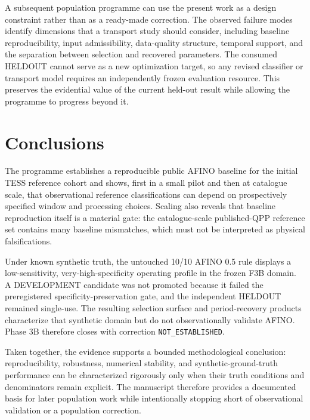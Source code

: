 \documentclass[11pt,a4paper]{article}
\begin{document}
A subsequent population programme can use the present work as a design constraint rather than as a ready-made correction. The observed failure modes identify dimensions that a transport study should consider, including baseline reproducibility, input admissibility, data-quality structure, temporal support, and the separation between selection and recovered parameters. The consumed HELDOUT cannot serve as a new optimization target, so any revised classifier or transport model requires an independently frozen evaluation resource. This preserves the evidential value of the current held-out result while allowing the programme to progress beyond it.

\section{Conclusions}
The programme establishes a reproducible public AFINO baseline for the initial TESS reference cohort and shows, first in a small pilot and then at catalogue scale, that observational reference classifications can depend on prospectively specified window and processing choices. Scaling also reveals that baseline reproduction itself is a material gate: the catalogue-scale published-QPP reference set contains many baseline mismatches, which must not be interpreted as physical falsifications.

Under known synthetic truth, the untouched 10/10 AFINO 0.5 rule displays a low-sensitivity, very-high-specificity operating profile in the frozen F3B domain. A DEVELOPMENT candidate was not promoted because it failed the preregistered specificity-preservation gate, and the independent HELDOUT remained single-use. The resulting selection surface and period-recovery products characterize that synthetic domain but do not observationally validate AFINO. Phase 3B therefore closes with correction \texttt{NOT\_ESTABLISHED}.

Taken together, the evidence supports a bounded methodological conclusion: reproducibility, robustness, numerical stability, and synthetic-ground-truth performance can be characterized rigorously only when their truth conditions and denominators remain explicit. The manuscript therefore provides a documented basis for later population work while intentionally stopping short of observational validation or a population correction.
\end{document}
